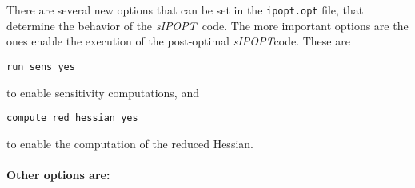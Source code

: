 \documentclass[letter, 11pt]{article}
\newcommand{\sensKKT}{\emph{sIPOPT}}
\begin{document}
There are several new options that can be set in the {\tt ipopt.opt} file, that determine the behavior of the \sensKKT\ code. The more important options are the ones enable the execution of the post-optimal \sensKKT code. These are

\begin{verbatim}
run_sens yes
\end{verbatim}

\noindent to enable sensitivity computations, and

\begin{verbatim}
compute_red_hessian yes
\end{verbatim}

\noindent to enable the computation of the reduced Hessian.

\paragraph{Other options are:}
\end{document}

